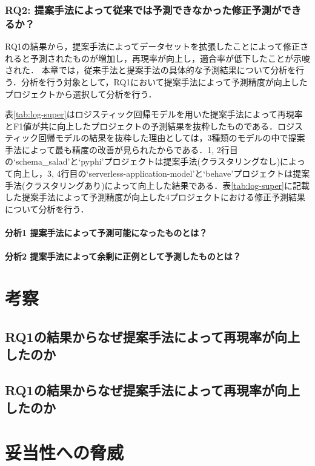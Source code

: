 \documentclass[11pt,dvipdfmx]{jreport}
\begin{document}
\subsection{RQ2: 提案手法によって従来では予測できなかった修正予測ができるか？}\label{RQ2}

RQ1の結果から，提案手法によってデータセットを拡張したことによって修正されると予測されたものが増加し，再現率が向上し，適合率が低下したことが示唆された．
本章では，従来手法と提案手法の具体的な予測結果について分析を行う．分析を行う対象として，RQ1において提案手法によって予測精度が向上したプロジェクトから選択して分析を行う．

表\ref{tab:log-super}はロジスティック回帰モデルを用いた提案手法によって再現率とF1値が共に向上したプロジェクトの予測結果を抜粋したものである．ロジスティック回帰モデルの結果を抜粋した理由としては，3種類のモデルの中で提案手法によって最も精度の改善が見られたからである．1, 2行目の`schema\_salad'と`pyphi'プロジェクトは提案手法(クラスタリングなし)によって向上し，3, 4行目の`serverless-application-model'と`behave'プロジェクトは提案手法(クラスタリングあり)によって向上した結果である．表\ref{tab:log-super}に記載した提案手法によって予測精度が向上した4プロジェクトにおける修正予測結果について分析を行う．



\subsubsection{分析1 提案手法によって予測可能になったものとは？}

\subsubsection{分析2 提案手法によって余剰に正例として予測したものとは？}


\chapter{考察}\label{chap:consideration}
\section{RQ1の結果からなぜ提案手法によって再現率が向上したのか}
\section{RQ1の結果からなぜ提案手法によって再現率が向上したのか}


\chapter{妥当性への脅威}\label{chap:heuristic}
\end{document}
